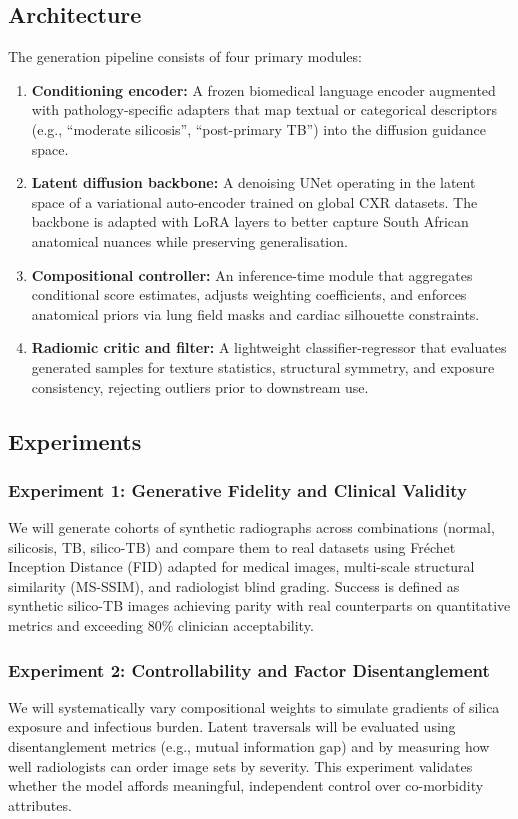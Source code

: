 \subsection{Architecture}
The generation pipeline consists of four primary modules:
\begin{enumerate}
    \item \textbf{Conditioning encoder:} A frozen biomedical language encoder augmented with pathology-specific adapters that map textual or categorical descriptors (e.g., ``moderate silicosis'', ``post-primary TB'') into the diffusion guidance space.
    \item \textbf{Latent diffusion backbone:} A denoising UNet operating in the latent space of a variational auto-encoder trained on global CXR datasets. The backbone is adapted with LoRA layers to better capture South African anatomical nuances while preserving generalisation.
    \item \textbf{Compositional controller:} An inference-time module that aggregates conditional score estimates, adjusts weighting coefficients, and enforces anatomical priors via lung field masks and cardiac silhouette constraints.
    \item \textbf{Radiomic critic and filter:} A lightweight classifier-regressor that evaluates generated samples for texture statistics, structural symmetry, and exposure consistency, rejecting outliers prior to downstream use.
\end{enumerate}
\subsection{Experiments}
\subsubsection{Experiment 1: Generative Fidelity and Clinical Validity}
We will generate cohorts of synthetic radiographs across combinations (normal, silicosis, TB, silico-TB) and compare them to real datasets using Fr\'echet Inception Distance (FID) adapted for medical images, multi-scale structural similarity (MS-SSIM), and radiologist blind grading. Success is defined as synthetic silico-TB images achieving parity with real counterparts on quantitative metrics and exceeding 80\% clinician acceptability.

\subsubsection{Experiment 2: Controllability and Factor Disentanglement}
We will systematically vary compositional weights to simulate gradients of silica exposure and infectious burden. Latent traversals will be evaluated using disentanglement metrics (e.g., mutual information gap) and by measuring how well radiologists can order image sets by severity. This experiment validates whether the model affords meaningful, independent control over co-morbidity attributes.

